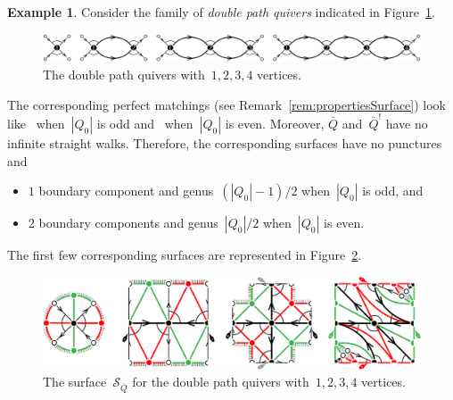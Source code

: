 \documentclass{amsart}
\theoremstyle{definition}
\newtheorem{example}[theorem]{Example}
\newcommand{\fref}[1]{Figure~\ref{#1}} %
\newcommand{\darkblue}{\color{darkblue}} %
\newcommand{\defn}[1]{\textsl{\darkblue #1}} %
\newcommand{\surface}{\mathcal{S}} %
\newcommand{\koszul}{^!} %
\begin{document}
\begin{example}
\label{exm:doublePath}
Consider the family of \defn{double path quivers} indicated in \fref{fig:doublePathsQuivers}.

\begin{figure}[h]
	\capstart
	\centerline{\includegraphics[scale=.45]{doublePathsQuivers}}
	\caption{The double path quivers with~$1, 2, 3, 4$ vertices.}
	\label{fig:doublePathsQuivers}
\end{figure}

The corresponding perfect matchings (see Remark~\ref{rem:propertiesSurface}) look like~ when~$|Q_0|$ is odd and~ when~$|Q_0|$ is even.
Moreover, $\bar Q$ and~$\bar Q\koszul$ have no infinite straight walks.
Therefore, the corresponding surfaces have no punctures and
\begin{itemize}
\item $1$ boundary component and genus~$(|Q_0|-1)/2$ when~$|Q_0|$ is odd, and 
\item $2$ boundary components and genus~$|Q_0|/2$ when~$|Q_0|$ is even.
\end{itemize}
The first few corresponding surfaces are represented in \fref{fig:doublePathsSurfaces}.

\begin{figure}[h]
	\capstart
	\centerline{\includegraphics[scale=.7]{doublePathsSurfaces}}
	\caption{The surface~$\surface_{\bar Q}$ for the double path quivers with~$1, 2, 3, 4$ vertices.}
	\label{fig:doublePathsSurfaces}
\end{figure}

\end{example}
\end{document}
